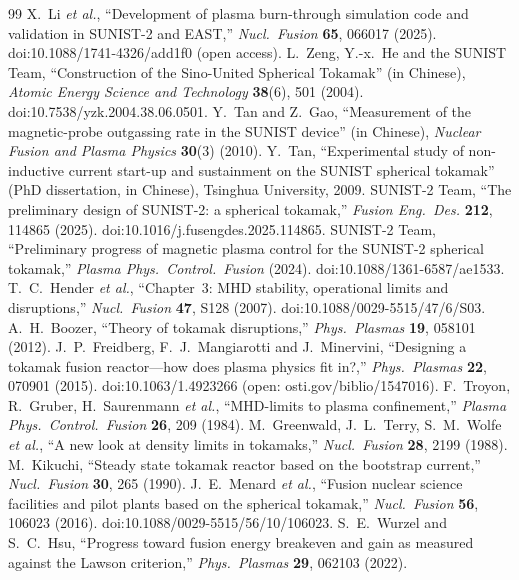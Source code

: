 \documentclass[11pt]{article}
\begin{document}
\begin{thebibliography}{99}
 X.~Li \emph{et al.}, ``Development of plasma burn-through simulation code and validation in SUNIST-2 and EAST,'' \emph{Nucl.\ Fusion} \textbf{65}, 066017 (2025). doi:10.1088/1741-4326/add1f0 (open access).
 L.~Zeng, Y.-x.~He and the SUNIST Team, ``Construction of the Sino-United Spherical Tokamak'' (in Chinese), \emph{Atomic Energy Science and Technology} \textbf{38}(6), 501 (2004). doi:10.7538/yzk.2004.38.06.0501.
 Y.~Tan and Z.~Gao, ``Measurement of the magnetic-probe outgassing rate in the SUNIST device'' (in Chinese), \emph{Nuclear Fusion and Plasma Physics} \textbf{30}(3) (2010).
 Y.~Tan, ``Experimental study of non-inductive current start-up and sustainment on the SUNIST spherical tokamak'' (PhD dissertation, in Chinese), Tsinghua University, 2009.
 SUNIST-2 Team, ``The preliminary design of SUNIST-2: a spherical tokamak,'' \emph{Fusion Eng.\ Des.} \textbf{212}, 114865 (2025). doi:10.1016/j.fusengdes.2025.114865.
 SUNIST-2 Team, ``Preliminary progress of magnetic plasma control for the SUNIST-2 spherical tokamak,'' \emph{Plasma Phys.\ Control.\ Fusion} (2024). doi:10.1088/1361-6587/ae1533.
 T.~C.~Hender \emph{et al.}, ``Chapter~3: MHD stability, operational limits and disruptions,'' \emph{Nucl.\ Fusion} \textbf{47}, S128 (2007). doi:10.1088/0029-5515/47/6/S03.
 A.~H.~Boozer, ``Theory of tokamak disruptions,'' \emph{Phys.\ Plasmas} \textbf{19}, 058101 (2012).
 J.~P.~Freidberg, F.~J.~Mangiarotti and J.~Minervini, ``Designing a tokamak fusion reactor---how does plasma physics fit in?,'' \emph{Phys.\ Plasmas} \textbf{22}, 070901 (2015). doi:10.1063/1.4923266 (open: osti.gov/biblio/1547016).
 F.~Troyon, R.~Gruber, H.~Saurenmann \emph{et al.}, ``MHD-limits to plasma confinement,'' \emph{Plasma Phys.\ Control.\ Fusion} \textbf{26}, 209 (1984).
 M.~Greenwald, J.~L.~Terry, S.~M.~Wolfe \emph{et al.}, ``A new look at density limits in tokamaks,'' \emph{Nucl.\ Fusion} \textbf{28}, 2199 (1988).
 M.~Kikuchi, ``Steady state tokamak reactor based on the bootstrap current,'' \emph{Nucl.\ Fusion} \textbf{30}, 265 (1990).
 J.~E.~Menard \emph{et al.}, ``Fusion nuclear science facilities and pilot plants based on the spherical tokamak,'' \emph{Nucl.\ Fusion} \textbf{56}, 106023 (2016). doi:10.1088/0029-5515/56/10/106023.
 S.~E.~Wurzel and S.~C.~Hsu, ``Progress toward fusion energy breakeven and gain as measured against the Lawson criterion,'' \emph{Phys.\ Plasmas} \textbf{29}, 062103 (2022).

\end{thebibliography}
\end{document}
